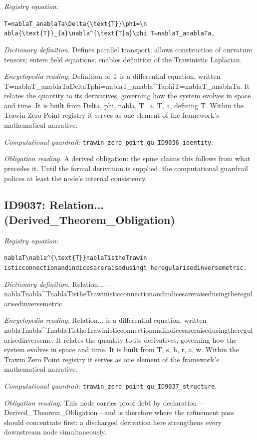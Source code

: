 \documentclass[11pt]{article}
\theoremstyle{remark}
\begin{document}
\noindent\textit{Registry equation:}\par
{\small\texttt{T=nablaT\_anablaTa\textbackslash{}Delta\{\textbackslash{}text\{T\}\}\textbackslash{}phi=\textbackslash{}n abla\{\textbackslash{}text\{T\}\}\_\{a\}\textbackslash{}nabla\textasciicircum{}\{\textbackslash{}text\{T\}a\}\textbackslash{}phi T=nablaT\_anablaTa,}}\par\medskip
\noindent\textit{Dictionary definition.} Defines parallel transport; allows construction of curvature tensors; enters field equations; enables definition of the Trawinistic Laplacian.\par\medskip
\noindent\textit{Encyclopedia reading.} Definition of T is a differential equation, written T=nablaT\_anablaTaDeltaTphi=nablaT\_anabla\textasciicircum{}TaphiT=nablaT\_anablaTa. It relates the quantity to its derivatives, governing how the system evolves in space and time. It is built from Delta, phi, nabla, T\_a, T, a, defining T. Within the Trawin Zero Point registry it serves as one element of the framework's mathematical narrative.
\par\medskip\noindent\textit{Computational guardrail:} \texttt{trawin\_zero\_point\_qu\_ID9036\_identity}.
\par\medskip\noindent\textit{Obligation reading.} A derived obligation: the spine claims this follows from what precedes it. Until the formal derivation is supplied, the computational guardrail polices at least the node's internal consistency.

\subsection{ID9037: Relation... (Derived\_Theorem\_Obligation)}

\noindent\textit{Registry equation:}\par
{\small\texttt{nablaT\textbackslash{}nabla\textasciicircum{}\{\textbackslash{}text\{T\}\}nablaTistheTrawin isticconnectionandindicesareraisedusingt heregularisedinversemetric.}}\par\medskip
\noindent\textit{Dictionary definition.} Relation... --- nablaTnabla\textasciicircum{}TnablaTistheTrawinisticconnectionandindicesareraisedusingtheregularisedinversemetric.\par\medskip
\noindent\textit{Encyclopedia reading.} Relation... is a differential equation, written nablaTnabla\textasciicircum{}TnablaTistheTrawinisticconnectionandindicesareraisedusingtheregularisedinverseme. It relates the quantity to its derivatives, governing how the system evolves in space and time. It is built from T, s, h, r, a, w. Within the Trawin Zero Point registry it serves as one element of the framework's mathematical narrative.
\par\medskip\noindent\textit{Computational guardrail:} \texttt{trawin\_zero\_point\_qu\_ID9037\_structure}.
\par\medskip\noindent\textit{Obligation reading.} This node carries proof debt by declaration---Derived\_Theorem\_Obligation---and is therefore where the refinement pass should concentrate first: a discharged derivation here strengthens every downstream node simultaneously.
\end{document}
